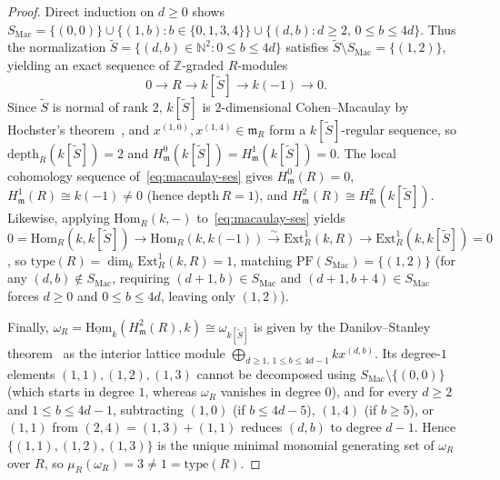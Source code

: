 \documentclass[11pt]{article}
\theoremstyle{definition}
\theoremstyle{remark}
\begin{document}
\begin{proof}
Direct induction on $d \ge 0$ shows $S_{\mathrm{Mac}} = \{(0,0)\} \cup \{(1, b) : b \in \{0, 1, 3, 4\}\} \cup \{(d, b) : d \ge 2,\, 0 \le b \le 4d\}$. Thus the normalization $\widetilde{S} = \{(d, b) \in \mathbb{N}^2 : 0 \le b \le 4d\}$ satisfies $\widetilde{S} \setminus S_{\mathrm{Mac}} = \{(1, 2)\}$, yielding an exact sequence of $\mathbb{Z}$-graded $R$-modules
\begin{equation}\label{eq:macaulay-ses}
  0 \longrightarrow R \longrightarrow k[\widetilde{S}] \longrightarrow k(-1) \longrightarrow 0.
\end{equation}
Since $\widetilde{S}$ is normal of rank $2$, $k[\widetilde{S}]$ is $2$-dimensional Cohen--Macaulay by Hochster's theorem~\cite{Hochster}, and $x^{(1,0)}, x^{(1,4)} \in \mathfrak{m}_R$ form a $k[\widetilde{S}]$-regular sequence, so $\mathrm{depth}_R(k[\widetilde{S}]) = 2$ and $H^0_{\mathfrak{m}}(k[\widetilde{S}]) = H^1_{\mathfrak{m}}(k[\widetilde{S}]) = 0$. The local cohomology sequence of~\eqref{eq:macaulay-ses} gives $H^0_{\mathfrak{m}}(R) = 0$, $H^1_{\mathfrak{m}}(R) \cong k(-1) \ne 0$ (hence $\mathrm{depth}\, R = 1$), and $H^2_{\mathfrak{m}}(R) \cong H^2_{\mathfrak{m}}(k[\widetilde{S}])$. Likewise, applying $\mathrm{Hom}_R(k, -)$ to~\eqref{eq:macaulay-ses} yields $0 = \mathrm{Hom}_R(k, k[\widetilde{S}]) \to \mathrm{Hom}_R(k, k(-1)) \xrightarrow{\sim} \mathrm{Ext}^1_R(k, R) \to \mathrm{Ext}^1_R(k, k[\widetilde{S}]) = 0$, so $\mathrm{type}(R) = \dim_k \mathrm{Ext}^1_R(k, R) = 1$, matching $\mathrm{PF}(S_{\mathrm{Mac}}) = \{(1, 2)\}$ (for any $(d, b) \notin S_{\mathrm{Mac}}$, requiring $(d+1, b) \in S_{\mathrm{Mac}}$ and $(d+1, b+4) \in S_{\mathrm{Mac}}$ forces $d \ge 0$ and $0 \le b \le 4d$, leaving only $(1, 2)$).

Finally, $\omega_R = \underline{\mathrm{Hom}}_k(H^2_{\mathfrak{m}}(R), k) \cong \omega_{k[\widetilde{S}]}$ is given by the Danilov--Stanley theorem~\cite[Thm.~6.3.5]{BH} as the interior lattice module $\bigoplus_{d \ge 1,\, 1 \le b \le 4d-1} k x^{(d, b)}$. Its degree-$1$ elements $(1,1), (1,2), (1,3)$ cannot be decomposed using $S_{\mathrm{Mac}} \setminus \{(0,0)\}$ (which starts in degree $1$, whereas $\omega_R$ vanishes in degree $0$), and for every $d \ge 2$ and $1 \le b \le 4d - 1$, subtracting $(1,0)$ (if $b \le 4d - 5$), $(1,4)$ (if $b \ge 5$), or $(1,1)$ from $(2,4) = (1,3) + (1,1)$ reduces $(d, b)$ to degree $d - 1$. Hence $\{(1,1), (1,2), (1,3)\}$ is the unique minimal monomial generating set of $\omega_R$ over $R$, so $\mu_R(\omega_R) = 3 \ne 1 = \mathrm{type}(R)$.
\end{proof}
\end{document}

